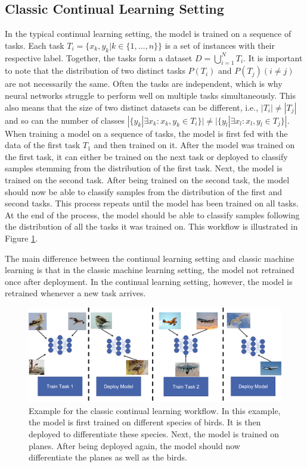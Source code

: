 \subsection{Classic Continual Learning Setting}
\label{sec:Methodology:CLSetting}
In the typical continual learning setting, the model is trained on a sequence of tasks. Each task $T_i = \{x_k,y_k | k \in \{1,\ldots,n\}\}$ is a set
of instances with their respective label. Together, the tasks form a dataset $D = \bigcup\limits_{i=1}^{N} T_i$. It is important to note that
the distribution of two distinct tasks $P(T_i)$  and $P(T_j) (i \neq j)$ are not necessarily the same. Often the tasks are independent, which is why
neural networks struggle to perform well on multiple tasks simultaneously. This also means that the size of two distinct datasets
can be different, i.e., $|T_i| \neq |T_j|$ and so can the number of classes $|\{y_k | \exists x_k: x_k,y_k \in T_i \}| \neq |\{y_l | \exists x_l: x_l,y_l
\in T_j\}|$. When training a model on a sequence of tasks, the model is first fed with the data of the first task $T_1$ and then trained on it. 
After the model was trained on the first task, it can either be trained on the next task or deployed to classify samples stemming from the
distribution of the first task. Next, the model is trained on the second task. After being trained on the second task, the model should now be able to
classify samples from the distribution of the first and second tasks. This process repeats until the model has been trained on all
tasks. At the end of the process, the model should be able to classify samples following the distribution of all the tasks it was trained on.
This workflow is illustrated in Figure \ref{fig:CLWorkflow}. \par
The main difference between the continual learning setting and classic machine learning is that in the classic machine learning setting, the model
not retrained once after deployment. In the continual learning setting, however, the model is retrained whenever a new task arrives.

\begin{figure}[ht]
    \centering
    \includegraphics[width=.9\linewidth]{images/CL_workflow.png}
    \caption[Continual learning workflow]{Example for the classic continual learning workflow. In this example, the model is first trained on different species of
    birds. It is then deployed to differentiate these species. Next, the model is trained on planes. After being deployed again, the model should now differentiate
    the planes as well as the birds.}
    \label{fig:CLWorkflow}
  \end{figure}

